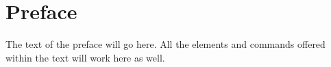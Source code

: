 \cleardoublepage
\chapter*{Preface}

The text of the preface will go here.  All the elements and commands offered within the text will work here as well.

